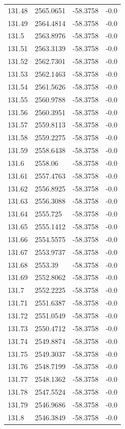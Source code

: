 \begin{table}[H]
\begin{tabular}{llll}
131.48 & 2565.0651 & -58.3758 & -0.0 \\
131.49 & 2564.4814 & -58.3758 & -0.0 \\
131.5 & 2563.8976 & -58.3758 & -0.0 \\
131.51 & 2563.3139 & -58.3758 & -0.0 \\
131.52 & 2562.7301 & -58.3758 & -0.0 \\
131.53 & 2562.1463 & -58.3758 & -0.0 \\
131.54 & 2561.5626 & -58.3758 & -0.0 \\
131.55 & 2560.9788 & -58.3758 & -0.0 \\
131.56 & 2560.3951 & -58.3758 & -0.0 \\
131.57 & 2559.8113 & -58.3758 & -0.0 \\
131.58 & 2559.2275 & -58.3758 & -0.0 \\
131.59 & 2558.6438 & -58.3758 & -0.0 \\
131.6 & 2558.06 & -58.3758 & -0.0 \\
131.61 & 2557.4763 & -58.3758 & -0.0 \\
131.62 & 2556.8925 & -58.3758 & -0.0 \\
131.63 & 2556.3088 & -58.3758 & -0.0 \\
131.64 & 2555.725 & -58.3758 & -0.0 \\
131.65 & 2555.1412 & -58.3758 & -0.0 \\
131.66 & 2554.5575 & -58.3758 & -0.0 \\
131.67 & 2553.9737 & -58.3758 & -0.0 \\
131.68 & 2553.39 & -58.3758 & -0.0 \\
131.69 & 2552.8062 & -58.3758 & -0.0 \\
131.7 & 2552.2225 & -58.3758 & -0.0 \\
131.71 & 2551.6387 & -58.3758 & -0.0 \\
131.72 & 2551.0549 & -58.3758 & -0.0 \\
131.73 & 2550.4712 & -58.3758 & -0.0 \\
131.74 & 2549.8874 & -58.3758 & -0.0 \\
131.75 & 2549.3037 & -58.3758 & -0.0 \\
131.76 & 2548.7199 & -58.3758 & -0.0 \\
131.77 & 2548.1362 & -58.3758 & -0.0 \\
131.78 & 2547.5524 & -58.3758 & -0.0 \\
131.79 & 2546.9686 & -58.3758 & -0.0 \\
131.8 & 2546.3849 & -58.3758 & -0.0 \\

\end{tabular}
\end{table}
